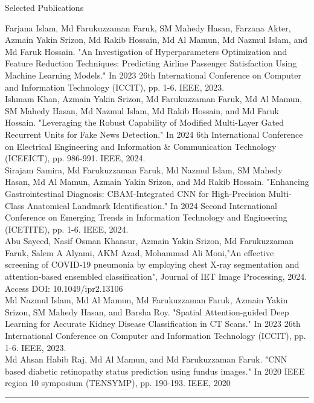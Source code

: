 \documentclass[a4paper,10pt]{article}
\newlength{\cvcolumngapwidth}
\newlength{\cvleftcolumnwidth}
\newlength{\cvrightcolumnwidth}
\newcommand{\cvsectionstyle}[1]{{\normalsize\cvsectionfont\textcolor{cvsectioncolor}{#1}}}
\newcommand{\cvheadingstyle}[1]{{\normalsize\cvheadingfont\textcolor{cvheadingcolor}{#1}}}
\newlength{\cvafteritemskipamount}
\newlength{\cvaftersectionskipamount}
\newlength{\cvparskip}
\newcommand{\cvsection}[1]{
    \begin{minipage}[t]{\cvleftcolumnwidth}
        \raggedleft\cvsectionstyle{#1}
    \end{minipage}%
    \hspace{\cvcolumngapwidth}%
    \begin{minipage}[t]{\cvrightcolumnwidth}
        \textcolor{cvrulecolor}{\rule{\cvrightcolumnwidth}{0.3mm}}
    \end{minipage}

    \vspace{\cvaftersectionskipamount}
}
\newcommand{\cvitem}[2]{
    \begin{minipage}[t]{\cvleftcolumnwidth}
        \raggedleft #1
    \end{minipage}%
    \hspace{\cvcolumngapwidth}%
    \begin{minipage}[t]{\cvrightcolumnwidth}
        \setlength{\parskip}{\cvparskip} #2
    \end{minipage}

    \vspace{\cvafteritemskipamount}
}
\begin{document}
\cvitem{
    \cvheadingstyle{Selected Publications}
} {

Farjana Islam, Md Farukuzzaman Faruk, SM Mahedy Hasan, Farzana Akter, Azmain Yakin Srizon, Md Rakib Hossain, Md Al Mamun, Md Nazmul Islam, and Md Faruk Hossain. "An Investigation of Hyperparameters Optimization and Feature Reduction Techniques: Predicting Airline Passenger Satisfaction Using Machine Learning Models." In 2023 26th International Conference on Computer and Information Technology (ICCIT), pp. 1-6. IEEE, 2023.
\vspace{2mm}\\
 Ishmam Khan, Azmain Yakin Srizon, Md Farukuzzaman Faruk, Md Al Mamun, SM Mahedy Hasan, Md Nazmul Islam, Md Rakib Hossain, and Md Faruk Hossain. "Leveraging the Robust Capability of Modified Multi-Layer Gated Recurrent Units for Fake News Detection." In 2024 6th International Conference on Electrical Engineering and Information & Communication Technology (ICEEICT), pp. 986-991. IEEE, 2024.
\vspace{2mm}\\
Sirajam Samira, Md Farukuzzaman Faruk, Md Nazmul Islam, SM Mahedy Hasan, Md Al Mamun, Azmain Yakin Srizon, and Md Rakib Hossain. "Enhancing Gastrointestinal Diagnosis: CBAM-Integrated CNN for High-Precision Multi-Class Anatomical Landmark Identification." In 2024 Second International Conference on Emerging Trends in Information Technology and Engineering (ICETITE), pp. 1-6. IEEE, 2024.
\vspace{2mm}\\
Abu Sayeed, Nasif Osman Khansur, Azmain Yakin Srizon, Md Farukuzzaman Faruk, Salem A Alyami, AKM Azad, Mohammad Ali Moni,"An effective screening of COVID‐19 pneumonia by employing chest X‐ray segmentation and attention‐based ensembled classification", Journal of IET Image Processing, 2024. Access DOI: 10.1049/ipr2.13106 
\vspace{2mm}\\
     Md Nazmul Islam, Md Al Mamun, Md Farukuzzaman Faruk, Azmain Yakin Srizon, SM Mahedy Hasan, and Barsha Roy. "Spatial Attention-guided Deep Learning for Accurate Kidney Disease Classification in CT Scans." In 2023 26th International Conference on Computer and Information Technology (ICCIT), pp. 1-6. IEEE, 2023.
    \vspace{2mm}\\
    Md Ahsan Habib Raj, Md Al Mamun, and Md Farukuzzaman Faruk. "CNN based diabetic retinopathy status prediction using fundus images." In 2020 IEEE region 10 symposium (TENSYMP), pp. 190-193. IEEE, 2020
    }
\cvsection{TRAINING \& WORKSHOPS}
\end{document}
